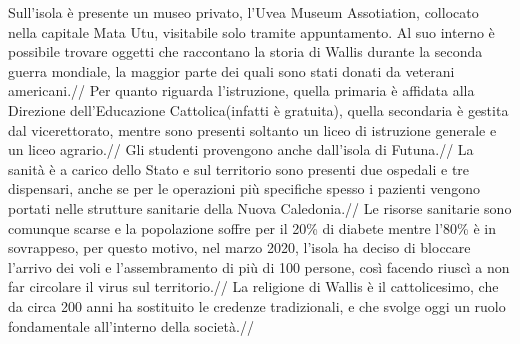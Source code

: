 \documentclass[fleqn,10pt]{SelfArx} %
\begin{document}
Sull'isola è presente un museo privato, l'Uvea Museum Assotiation, collocato nella capitale Mata Utu, visitabile solo tramite appuntamento. Al suo interno è possibile trovare oggetti che raccontano la storia di Wallis durante la seconda guerra mondiale, la maggior parte dei quali sono stati donati da veterani americani.//
Per quanto riguarda l'istruzione, quella primaria è affidata alla Direzione dell'Educazione Cattolica(infatti è gratuita), quella secondaria è gestita dal vicerettorato,  mentre sono presenti soltanto un liceo di istruzione generale e un liceo agrario.//
Gli studenti provengono anche dall'isola di Futuna.//
La sanità è a carico dello Stato e sul territorio sono presenti due ospedali e tre dispensari, anche se per le operazioni più specifiche spesso i pazienti vengono portati nelle strutture sanitarie della Nuova Caledonia.// 
Le risorse sanitarie sono comunque scarse e la popolazione soffre per il 20\% di diabete mentre l'80\% è in sovrappeso, per questo motivo, nel marzo 2020, l'isola ha deciso di bloccare l'arrivo dei voli e l'assembramento di più di 100 persone, così facendo riuscì a non far circolare il virus sul territorio.//
La religione di Wallis è il cattolicesimo, che da circa 200 anni ha sostituito le credenze tradizionali, e che svolge oggi un ruolo fondamentale all'interno della società.//
\end{document}
